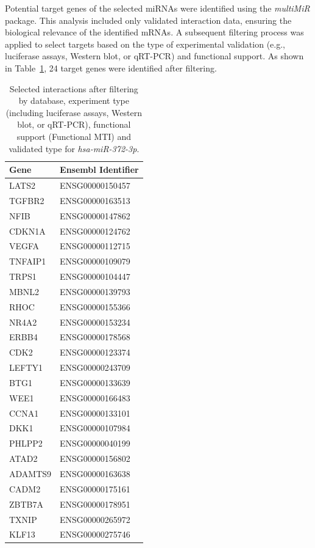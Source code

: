 \documentclass[
  11pt,
  letterpaper,
]{book}
\begin{document}
Potential target genes of the selected miRNAs were identified using the
\emph{multiMiR} package. This analysis included only validated
interaction data, ensuring the biological relevance of the identified
mRNAs. A subsequent filtering process was applied to select targets
based on the type of experimental validation (e.g., luciferase assays,
Western blot, or qRT-PCR) and functional support. As shown in
Table~\ref{tbl-hsa-miR-372-3p}, 24 target genes were identified after
filtering.

\begingroup\fontsize{11}{13}\selectfont

\begin{longtable}[t]{ll}

\caption{\label{tbl-hsa-miR-372-3p}Selected interactions after filtering
by database, experiment type (including luciferase assays, Western blot,
or qRT-PCR), functional support (Functional MTI) and validated type for
\emph{hsa-miR-372-3p}.}

\tabularnewline

\toprule
\textbf{Gene} & \textbf{Ensembl Identifier}\\
\midrule
LATS2 & ENSG00000150457\\
TGFBR2 & ENSG00000163513\\
NFIB & ENSG00000147862\\
CDKN1A & ENSG00000124762\\
VEGFA & ENSG00000112715\\
\addlinespace
TNFAIP1 & ENSG00000109079\\
TRPS1 & ENSG00000104447\\
MBNL2 & ENSG00000139793\\
RHOC & ENSG00000155366\\
NR4A2 & ENSG00000153234\\
\addlinespace
ERBB4 & ENSG00000178568\\
CDK2 & ENSG00000123374\\
LEFTY1 & ENSG00000243709\\
BTG1 & ENSG00000133639\\
WEE1 & ENSG00000166483\\
\addlinespace
CCNA1 & ENSG00000133101\\
DKK1 & ENSG00000107984\\
PHLPP2 & ENSG00000040199\\
ATAD2 & ENSG00000156802\\
ADAMTS9 & ENSG00000163638\\
\addlinespace
CADM2 & ENSG00000175161\\
ZBTB7A & ENSG00000178951\\
TXNIP & ENSG00000265972\\
KLF13 & ENSG00000275746\\
\bottomrule

\end{longtable}
\end{document}
